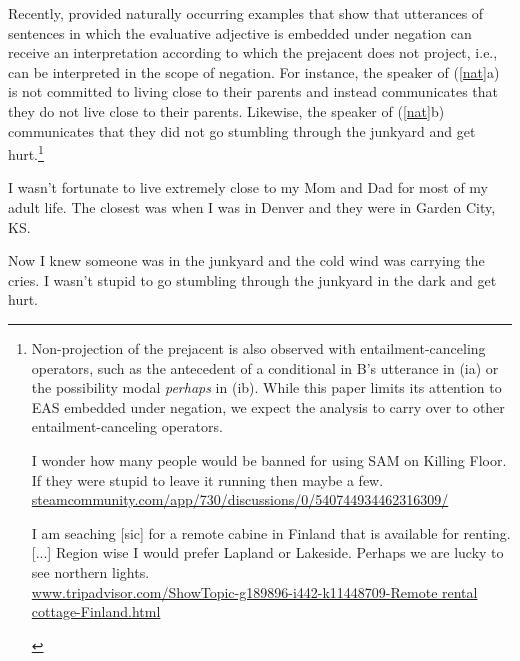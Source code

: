 \documentclass[11pt,fleqn]{article}
\newcommand{\6}{\mbox{$[\hspace*{-.6mm}[$}}
\newcommand{\9}{\mbox{$]\hspace*{-.6mm}]$}}
\begin{document}
Recently, \citet{karttunen-etal2014} provided naturally occurring examples that show that utterances of sentences in which the evaluative adjective is embedded under negation can receive an interpretation according to which the prejacent does not project, i.e., can be interpreted in the scope of negation. For instance, the speaker of (\ref{nat}a) is not committed to living close to their parents and instead communicates that they do not live close to their parents. Likewise, the speaker of (\ref{nat}b) communicates that they did not go stumbling through the junkyard and get hurt.\footnote{Non-projection of the prejacent is also observed with  entailment-canceling operators, such as the antecedent of a conditional in B's utterance in (ia) or the possibility modal {\em perhaps} in (ib). While this paper limits its attention to EAS embedded under negation, we expect the analysis to carry over to other entailment-canceling operators.

\begin{exe}
\begin{xlist}
\ex 
\begin{xlist}
 I wonder how many people would be banned for using SAM on Killing Floor.
 If they were stupid to leave it running then maybe a few.\\ \url{steamcommunity.com/app/730/discussions/0/540744934462316309/}
\end{xlist}

\ex I am seaching [sic] for a remote cabine in Finland that is available for renting. [...]
Region wise I would prefer Lapland or Lakeside. Perhaps we are lucky to see northern lights. \\ \url{www.tripadvisor.com/ShowTopic-g189896-i442-k11448709-Remote rental cottage-Finland.html}

\end{xlist}
\end{exe}

}

\begin{exe}
\ex\label{nat} \citealt[235]{karttunen-etal2014}
\begin{xlist}
\ex I wasn't fortunate to live extremely close to my Mom and Dad for most of my adult life. The closest was when I was in Denver and they were in Garden City, KS.

\ex  Now I knew someone was in the junkyard and the cold wind was
carrying the cries. I wasn't stupid to go stumbling through the
junkyard in the dark and get hurt.

\end{xlist} \end{exe} 
\end{document}
